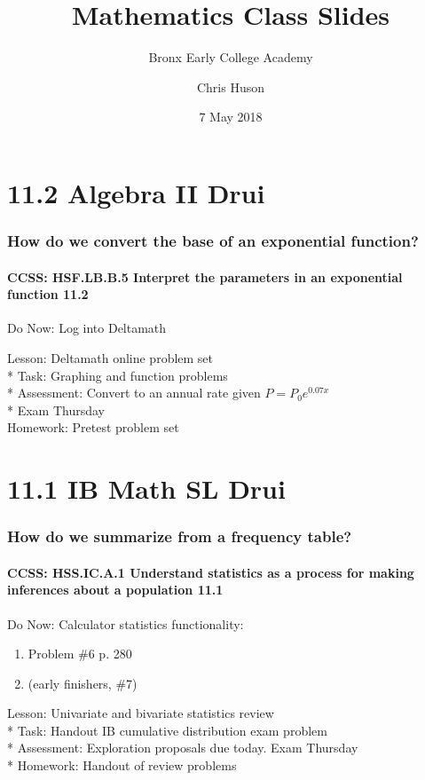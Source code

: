 \documentclass{beamer}
\title{Mathematics Class Slides}
\subtitle{Bronx Early College Academy}
\author{Chris Huson}
\date{7 May 2018}
\begin{document}
\frame{\titlepage}


\section{11.2 Algebra II Drui}
\frame
{
  \frametitle{How do we convert the base of an exponential function?}
  \framesubtitle{CCSS: HSF.LB.B.5 Interpret the parameters in an exponential function \qquad \alert{11.2}}

  \begin{block}{Do Now: Log into Deltamath} %
  \end{block}
  Lesson: Deltamath online problem set\\*
  Task: Graphing and function problems\\*
  Assessment: Convert to an annual rate given $P=P_0e^{0.07x}$\\*
  \alert{Exam Thursday}\\
  Homework: Pretest problem set\\
}


\section{11.1 IB Math SL Drui}
\frame
{
  \frametitle{How do we summarize from a frequency table?}
  \framesubtitle{CCSS: HSS.IC.A.1 Understand statistics as a process for making inferences about a population \qquad \alert{11.1}}

  \begin{block}{Do Now: Calculator statistics functionality:}
  \begin{enumerate}
      \item Problem \#6 p. 280 
      \item (early finishers, \#7)
  \end{enumerate}
  \end{block}
  Lesson: Univariate and bivariate statistics review\\*
  Task: Handout IB cumulative distribution exam problem\\*
  Assessment: Exploration proposals due today. Exam Thursday\\*
  Homework: Handout of review problems\\
}
\end{document}
